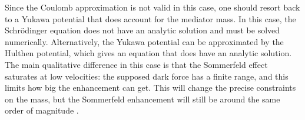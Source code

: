 Since the Coulomb approximation is not valid in this case, one should resort back to a Yukawa potential that does account for the mediator mass. In this case, the Schrödinger equation does not have an analytic solution and must be solved numerically. Alternatively, the Yukawa potential can be approximated by the Hulthen potential, which gives an equation that does have an analytic solution. The main qualitative difference in this case is that the Sommerfeld effect saturates at low velocities: the supposed dark force has a finite range, and this limits how big the enhancement can get. This will change the precise constraints on the mass, but the Sommerfeld enhancement will still be around the same order of magnitude \cite{Arkani_2009}.